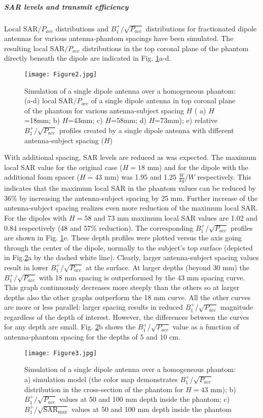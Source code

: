 \documentclass[fleqn,10pt]{wlscirep}
\begin{document}
\subparagraph*{SAR levels and transmit efficiency}
Local SAR$/P_{acc}$ distributions and $B_1^{+}/{\sqrt{P_{acc}}}$ distributions for fractionated dipole antennas for various antenna-phantom spacings have been simulated. The resulting local SAR$/P_{acc}$ distributions in the top coronal plane of the phantom directly beneath the dipole are indicated in Fig. \ref{SAR}a-d.
%
\begin{figure}[ht]
\center
\texttt{[image: Figure2.jpg]}
\caption{Simulation of a single dipole antenna over a homogeneous phantom: (a-d) local SAR$/{P_{acc}}$ of a single dipole antenna in top coronal plane of the phantom for various antenna-subject spacing $H$ ( a) $H$=18mm; b) $H$=43mm; c) $H$=58mm; d) $H$=73mm); e) relative $B_1^{+}/{\sqrt{P_{acc}}}$ profiles created by a single dipole antenna with different antenna-subject spacing ($H$)}
\label{SAR}
\end{figure}
%
With additional spacing, SAR levels are reduced as was expected. The maximum local SAR value for the original case ($H=18$ mm) and for the dipole with the additional foam spacer ($H=43$ mm) was 1.95 and 1.25 $\frac{W}{kg}/W$ respectively. This indicates that the maximum local SAR in the phantom values can be reduced by 36\% by increasing the antenna-subject spacing by 25 mm. Further increase of the antenna-subject spacing realizes even more reduction of the maximum local SAR. For the dipoles with $H=58$ and 73 mm maximum local SAR values are 1.02 and 0.84 respectively (48 and 57\% reduction).
The corresponding $B_1^{+}/{\sqrt{P_{acc}}}$ profiles are shown in Fig. \ref{SAR}e. 
These depth profiles were plotted versus the axis going through the center of the dipole, normally to the subject's top surface (depicted in Fig.\ref{in_depth}a by the dashed white line). Clearly, larger antenna-subject spacing values result in lower $B_1^{+}/{\sqrt{P_{acc}}}$ at the surface. At larger depths (beyond 30 mm) the $B_1^{+}/{\sqrt{P_{acc}}}$ with 18 mm spacing is outperformed by the 43 mm spacing curve. This graph continuously decreases more steeply than the others so at larger depths also the other graphs outperform the 18 mm curve. All the other curves are more or less parallel: larger spacing results in reduced $B_1^{+}/{\sqrt{P_{acc}}}$ magnitude regardless of the depth of interest. However, the differences between the curves for any depth are small. Fig. \ref{in_depth}b shows the $B_1^{+}/{\sqrt{P_{acc}}}$ value as a function of antenna-phantom spacing for the depths of 5 and 10 cm. 
%
\begin{figure}[t]
\center
\texttt{[image: Figure3.jpg]}
\caption{Simulation of a single dipole antenna over a homogeneous phantom: a) simulation model (the color map demonstrates $B_1^{+}/{\sqrt{P_{acc}}}$ distribution in the cross-section of the phantom for $H=43$ mm); b) $B_1^{+}/{\sqrt{P_{acc}}}$ values at 50 and 100 mm depth inside the phantom; c) $B_1^{+}/\sqrt{\text{SAR}_{\text{max}}}$ values at 50 and 100 mm depth inside the phantom}
\label{in_depth}
\end{figure}
\end{document}
